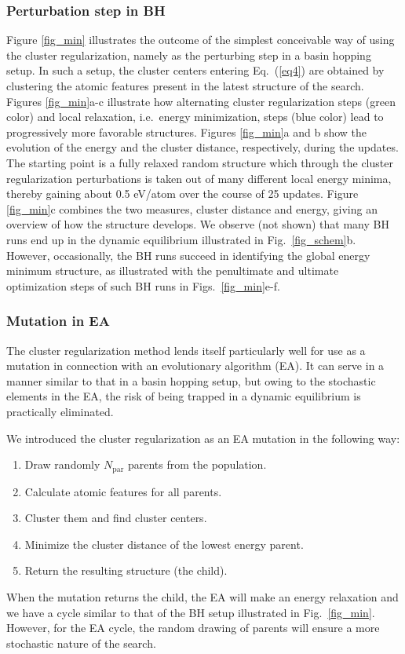 \documentclass[aip,amsmath,amssymb,reprint]{revtex4-1}
\begin{document}
\subsubsection{Perturbation step in BH}
Figure \ref{fig_min} illustrates the outcome of the simplest
conceivable way of using the cluster regularization, namely as the
perturbing step in a basin hopping setup. In such a setup, the cluster
centers entering Eq.\ (\ref{eq4}) are obtained by clustering the
atomic features present in the latest structure of the search. Figures
\ref{fig_min}a-c illustrate how alternating cluster regularization
steps (green color) and local relaxation, i.e.\ energy minimization,
steps (blue color) lead to progressively more favorable
structures. Figures \ref{fig_min}a and b show the evolution of the
energy and the cluster distance, respectively, during the updates. The
starting point is a fully relaxed random structure which through the
cluster regularization perturbations is taken out of many different
local energy minima, thereby gaining about 0.5 eV/atom over the course of
25 updates. Figure \ref{fig_min}c combines the two measures, cluster
distance and energy, giving an overview of how the structure
develops. We observe (not shown) that many BH runs end up in the dynamic
equilibrium illustrated in Fig.\  \ref{fig_schem}b. However, occasionally, the BH runs succeed in
identifying the global energy minimum structure, as illustrated with
the penultimate and ultimate optimization steps of such BH runs in
Figs.\  \ref{fig_min}e-f.

\subsubsection{Mutation in EA}
The cluster regularization method lends itself particularly well for
use as a mutation in connection with an evolutionary algorithm (EA). It can
serve in a manner similar to that in a basin hopping setup, but owing
to the stochastic elements in the EA, the risk of being trapped in a
dynamic equilibrium is practically eliminated.

We introduced the cluster regularization as an EA mutation in the following way:
\begin{enumerate}
\item Draw randomly $N_\mathrm{par}$ parents from the population.
\item Calculate atomic features for all parents.
\item Cluster them and find cluster centers.
\item Minimize the cluster distance of the lowest energy parent.
\item Return the resulting structure (the child).
\end{enumerate}
When the mutation returns the child, the EA will make an energy
relaxation and we have a cycle similar to that of the BH setup
illustrated in Fig.\  \ref{fig_min}. However, for the EA cycle, the
random drawing of parents will ensure a more stochastic nature of the
search.
\end{document}
